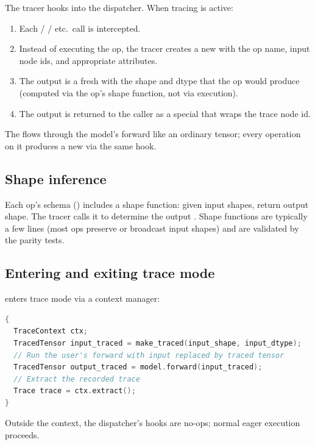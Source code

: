 The tracer hooks into the dispatcher. When tracing is active:

\begin{enumerate}
  \item Each  /  / etc.\ call
    is intercepted.
  \item Instead of executing the op, the tracer creates a new
     with the op name, input node ids, and
    appropriate attributes.
  \item The output is a fresh  with the shape
    and dtype that the op would produce (computed via the op's
    shape function, not via execution).
  \item The output is returned to the caller as a special
     that wraps the trace node id.
\end{enumerate}

The  flows through the model's forward like
an ordinary tensor; every operation on it produces a new
 via the same hook.

\subsection{Shape inference}
\label{ssec:tracer:shape_inference}

Each op's schema () includes a shape
function: given input shapes, return output shape. The tracer
calls it to determine the output . Shape
functions are typically a few lines (most ops preserve or
broadcast input shapes) and are validated by the parity tests.

\subsection{Entering and exiting trace mode}
\label{ssec:tracer:enter_exit}

 enters trace mode via a context manager:

\begin{lstlisting}[style=lucidcpp,language=C++]
{
  TraceContext ctx;
  TracedTensor input_traced = make_traced(input_shape, input_dtype);
  // Run the user's forward with input replaced by traced tensor
  TracedTensor output_traced = model.forward(input_traced);
  // Extract the recorded trace
  Trace trace = ctx.extract();
}
\end{lstlisting}

Outside the context, the dispatcher's hooks are no-ops; normal
eager execution proceeds.

